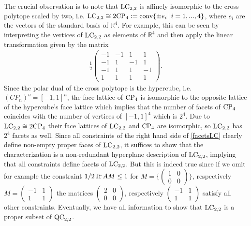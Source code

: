 The crucial observation is to note that $ \textup{LC}_{2,2} $ is affinely isomorphic to the cross polytope scaled  by two, i.e. 
$ \textup{LC}_{2,2} \cong 2\textup{CP}_4 := \textup{conv} \{  \pm e_i \, | \, i = 1,...,4 \} $, where $ e_i $ are the vectors of the standard basis of $ \mathbb{R}^4 $. For example, this can be seen by interpreting the vertices of $ \textup{LC}_{2,2} $ as elements of $ \mathbb{R}^4 $ and then apply the linear transformation given by the matrix 
\begin{align*}
	\frac{1}{2}\begin{pmatrix}
		-1 & -1 & 1 & 1 \\
		-1 & 1 & -1 & 1 \\
		-1 & 1 & 1 & -1 \\
		1 & 1 & 1 & 1 
	\end{pmatrix}.
\end{align*}
Since the polar dual of the cross polytope is the hypercube, i.e. $ (CP_n)^o = [-1,1]^n $,  the face lattice of $ \textup{CP}_4 $ is isomorphic to the opposite lattice of the hypercube's face lattice which implies that the number of facets of $ \textup{CP}_4 $ coincides with the number of vertices of $ [-1,1]^4 $ which is $ 2^4 $. Due to $  \textup{LC}_{2,2} \cong 2\textup{CP}_4$ their face lattices of $ \textup{LC}_{2,2} $ and $ \textup{CP}_4 $ are isomorphic, so $ \textup{LC}_{2,2} $ has $ 2^4 $ facets as well. 
Since all constraints of the right hand side of \ref{facetsLC} clearly define non-empty proper faces of $ \textup{LC}_{2,2} $, it suffices to show that the characterization is a non-redundant hyperplane description of $ \textup{LC}_{2,2} $, implying that all constraints define facets of $ \textup{LC}_{2,2} $. But this is indeed true since if we omit for example the constraint 
$ 1/2 \text{Tr} \, {AM}  \le 1 $ for $ M = \{ \begin{pmatrix}
1 & 0 \\ 0 & 0
\end{pmatrix} \} $, respectively $ M = \begin{pmatrix}
-1 & 1 \\ 1 & 1 
\end{pmatrix} $
the matrices $ \begin{pmatrix}
2 & 0 \\ 0 & 0 
\end{pmatrix} $, respectively $ \begin{pmatrix}
-1 & 1 \\ 1 & 1
\end{pmatrix} $ 
satisfy all other constraints. 
Eventually, we have all information to show that $ \textup{LC}_{2,2} $ is a proper subset of $ \textup{QC}_{2,2} $. 
